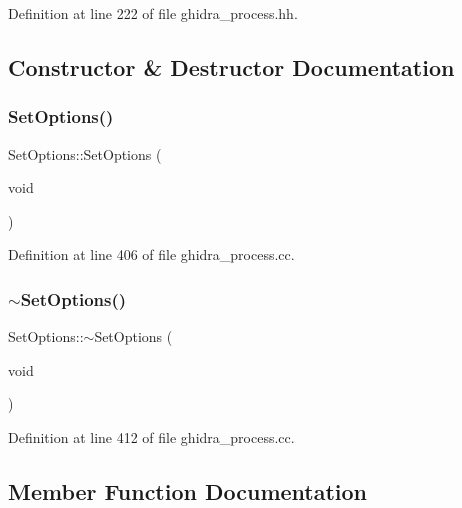 Definition at line 222 of file ghidra\+\_\+process.\+hh.



\subsection{Constructor \& Destructor Documentation}
\mbox{\label{class_set_options_a2712c10fd1378d9f4e40ad93d2b9fe93}} 
\subsubsection{\texorpdfstring{SetOptions()}{SetOptions()}}
{\footnotesize\ttfamily Set\+Options\+::\+Set\+Options (\begin{DoxyParamCaption}\item[{void}]{ }\end{DoxyParamCaption})}



Definition at line 406 of file ghidra\+\_\+process.\+cc.

\mbox{\label{class_set_options_aef37b96807c1e29662e725bbeefcc489}} 
\subsubsection{\texorpdfstring{$\sim$SetOptions()}{~SetOptions()}}
{\footnotesize\ttfamily Set\+Options\+::$\sim$\+Set\+Options (\begin{DoxyParamCaption}\item[{void}]{ }\end{DoxyParamCaption})\hspace{0.3cm}{\ttfamily [virtual]}}



Definition at line 412 of file ghidra\+\_\+process.\+cc.



\subsection{Member Function Documentation}
\mbox{\label{class_set_options_a1e73126b79340651e9fa9cfc47e80649}} 
